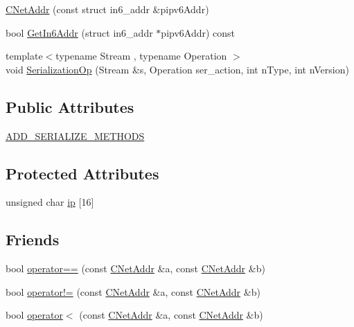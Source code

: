\begin{DoxyCompactItemize}
\item 
\hyperlink{class_c_net_addr_a9eae4232457f7659a157467274d1b444}{C\+Net\+Addr} (const struct in6\+\_\+addr \&pipv6\+Addr)
\item 
bool \hyperlink{class_c_net_addr_add7811be50f5fe60c4fa65b461dea98c}{Get\+In6\+Addr} (struct in6\+\_\+addr $\ast$pipv6\+Addr) const 
\item 
{\footnotesize template$<$typename Stream , typename Operation $>$ }\\void \hyperlink{class_c_net_addr_a7c914d155a533f64f8aa0d2f9bfff8a7}{Serialization\+Op} (Stream \&s, Operation ser\+\_\+action, int n\+Type, int n\+Version)
\end{DoxyCompactItemize}
\subsection*{Public Attributes}
\begin{DoxyCompactItemize}
\item 
\hyperlink{class_c_net_addr_ab08e22719f96b42c61e998158a895e5f}{A\+D\+D\+\_\+\+S\+E\+R\+I\+A\+L\+I\+Z\+E\+\_\+\+M\+E\+T\+H\+O\+D\+S}
\end{DoxyCompactItemize}
\subsection*{Protected Attributes}
\begin{DoxyCompactItemize}
\item 
unsigned char \hyperlink{class_c_net_addr_acff7ce68f33f8dfbfe6d79d80928d417}{ip} \mbox{[}16\mbox{]}
\end{DoxyCompactItemize}
\subsection*{Friends}
\begin{DoxyCompactItemize}
\item 
bool \hyperlink{class_c_net_addr_a6cc88956853ab8dc9586d55cda059934}{operator==} (const \hyperlink{class_c_net_addr}{C\+Net\+Addr} \&a, const \hyperlink{class_c_net_addr}{C\+Net\+Addr} \&b)
\item 
bool \hyperlink{class_c_net_addr_ac361eb83c41464359dfb1dfc296c3a4c}{operator!=} (const \hyperlink{class_c_net_addr}{C\+Net\+Addr} \&a, const \hyperlink{class_c_net_addr}{C\+Net\+Addr} \&b)
\item 
bool \hyperlink{class_c_net_addr_af220590d55a24354e2ba2e547e34fd77}{operator$<$} (const \hyperlink{class_c_net_addr}{C\+Net\+Addr} \&a, const \hyperlink{class_c_net_addr}{C\+Net\+Addr} \&b)
\end{DoxyCompactItemize}


